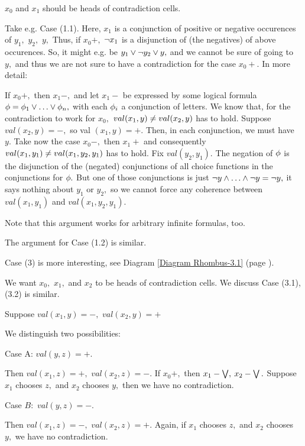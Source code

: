 $x_{0}$ and $x_{1}$ should be heads of contradiction cells.

Take e.g. Case (1.1). Here, $x_{1}$ is a conjunction of positive or
negative
occurences of $y_{1},$ $y_{2},$ $y,$ Thus, if $x_{0}+,$ $ \neg x_{1}$ is a
disjunction of
(the negatives) of above occurences. So, it might e.g. be $y_{1} \vee \neg
y_{2} \vee y,$
and we cannot be sure of going to $y,$ and thus we are not sure to have
a contradiction for the case $x_{0}+.$
In more detail:

If $x_{0}+,$ then $x_{1}-,$ and let $x_{1}-$ be expressed by some logical
formula
$ \phi = \phi_{1} \vee  \ldots  \vee \phi_{n},$ with each $ \phi_{i}$ a
conjunction of letters.
We know that, for the contradiction to work for $x_{0},$ $val(x_{1},y)
\neq val(x_{2},y)$
has to hold. Suppose $val(x_{2},y)=-,$ so val $(x_{1},y)=+.$
Then, in each conjunction, we must have $y.$ Take now the case $x_{0}-,$
then $x_{1}+$
and consequently $val(x_{1},y_{1}) \neq val(x_{1},y_{2},y_{1})$ has to
hold. Fix $val(y_{2},y_{1}).$
The negation of $ \phi $ is the disjunction of the (negated) conjunctions
of all choice functions in the conjunctions for $ \phi.$ But one of
those conjunctions is just $ \neg y \wedge  \ldots  \wedge \neg y= \neg y,$ it
says nothing about
$y_{1}$ or $y_{2},$ so we cannot force any coherence between
$val(x_{1},y_{1})$ and
$val(x_{1},y_{2},y_{1}).$

Note that this argument works for arbitrary infinite formulas, too.

The argument for Case (1.2) is similar.

Case (3) is more interesting, see
Diagram \ref{Diagram Rhombus-3.1} (page \pageref{Diagram Rhombus-3.1}).

We want $x_{0},$ $x_{1},$ and $x_{2}$ to be heads of contradiction cells.
We discuss Case (3.1), (3.2) is similar.

Suppose $val(x_{1},y)=-,$ $val(x_{2},y)=+$

We distinguish two possibilities:

Case A: $val(y,z)=+.$

Then $val(x_{1},z)=+,$ $val(x_{2},z)=-.$
If $x_{0}+,$ then $x_{1}- \bigvee,$ $x_{2}- \bigvee.$ Suppose $x_{1}$ chooses
$z,$ and $x_{2}$ chooses $y,$ then
we have no contradiction.

Case $B:$ $val(y,z)=-.$

Then $val(x_{1},z)=-,$ $val(x_{2},z)=+.$
Again, if $x_{1}$ chooses $z,$ and $x_{2}$ chooses $y,$ we have no
contradiction.


\clearpage


